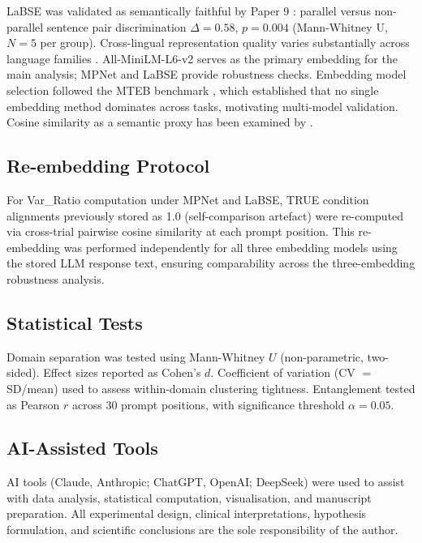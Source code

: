 \documentclass[11pt,a4paper]{article}
\begin{document}
LaBSE was validated as semantically faithful by Paper 9 \citep{laxman2026i}: parallel
versus non-parallel sentence pair discrimination $\Delta = 0.58$, $p = 0.004$
(Mann-Whitney U, $N = 5$ per group). Cross-lingual representation quality varies
substantially across language families \citep{conneau2020,jin2024}. All-MiniLM-L6-v2
serves as the primary embedding for the main analysis; MPNet and LaBSE provide
robustness checks. Embedding model selection followed the MTEB benchmark
\citep{muennighoff2023,enevoldsen2025mmteb}, which established that no single embedding
method dominates across tasks, motivating multi-model validation. Cosine similarity as
a semantic proxy has been examined by \citet{gao2021simcse,steck2024cosine,ethayarajh2019contextual}.

\subsection{Re-embedding Protocol}

For Var\_Ratio computation under MPNet and LaBSE, TRUE condition alignments previously
stored as 1.0 (self-comparison artefact) were re-computed via cross-trial pairwise
cosine similarity at each prompt position. This re-embedding was performed independently
for all three embedding models using the stored LLM response text, ensuring comparability
across the three-embedding robustness analysis.

\subsection{Statistical Tests}

Domain separation was tested using Mann-Whitney $U$ (non-parametric, two-sided). Effect
sizes reported as Cohen's $d$. Coefficient of variation (CV $=$ SD/mean) used to assess
within-domain clustering tightness. Entanglement tested as Pearson $r$ across 30 prompt
positions, with significance threshold $\alpha = 0.05$.

\subsection{AI-Assisted Tools}

AI tools (Claude, Anthropic; ChatGPT, OpenAI; DeepSeek) were used to assist with data
analysis, statistical computation, visualisation, and manuscript preparation. All
experimental design, clinical interpretations, hypothesis formulation, and scientific
conclusions are the sole responsibility of the author.
\end{document}

